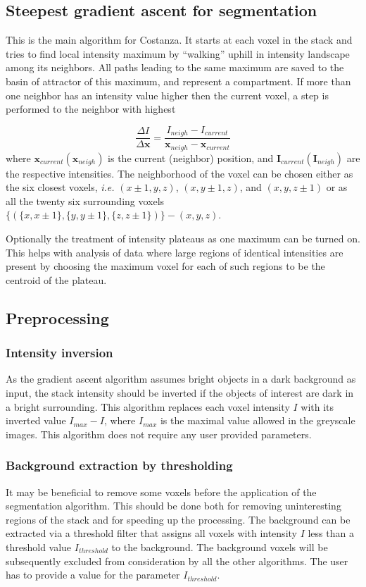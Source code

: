\documentclass[a4paper,12pt]{article}
\begin{document}
\subsection{Steepest gradient ascent for segmentation}
%
This is the main algorithm for Costanza. It starts at each voxel in the stack
and tries to find local intensity maximum by ``walking'' uphill in intensity landscape
among its neighbors. All paths leading to the same maximum are saved to the
basin of attractor of this maximum, and represent a compartment. If more than one neighbor
has an intensity value higher then the current voxel, a step is performed to
the neighbor with highest

\begin{equation}
\frac{\Delta I}{\Delta \mathbf{x}} =
\frac{I_{neigh}-I_{current}}{\mathbf{x}_{neigh}-\mathbf{x}_{current}}
\end{equation}
where $\mathbf{x}_{current}(\mathbf{x}_{neigh})$ is the current (neighbor)
position, and $\mathbf{I}_{current}(\mathbf{I}_{neigh})$ are the respective intensities.
The neighborhood of the voxel can be chosen either as the six closest voxels, 	\textit{i.e.}
$(x\pm1,y,z)$, $(x,y\pm1,z)$, and $(x,y,z\pm1)$ or as all the twenty six surrounding voxels $\{(\{x,x\pm1\},\{y,y\pm1\},\{z,z\pm1\})\}-(x,y,z)$.

Optionally the treatment of intensity plateaus as one maximum can be turned on. This helps with analysis of data where large regions of identical intensities are present by choosing the maximum voxel for each of such regions to be the centroid of the plateau. 

\subsection{Preprocessing}

\subsubsection{Intensity inversion}
As the gradient ascent algorithm assumes bright objects in a dark background
as input, the stack intensity should be inverted if the objects of interest
are dark in a bright surrounding. This algorithm replaces each voxel intensity
$I$ with its inverted value $I_{max}-I$, where $I_{max}$ is the maximal value
allowed in the greyscale images. This algorithm does not require any user
provided parameters.

\subsubsection{Background extraction by thresholding}
It may be beneficial to remove some voxels before the application of the
segmentation algorithm. This should be done both for removing uninteresting
regions of the stack and for speeding up the processing. The background can be
extracted via a threshold filter that assigns all voxels with intensity $I$
less than a threshold value $I_{threshold}$ to the background. The background
voxels will be subsequently excluded from consideration by all the other
algorithms. The user has to provide a value for the parameter $I_{threshold}$.
\end{document}
